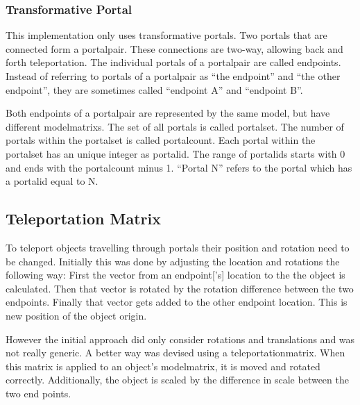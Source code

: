 \subsubsection{Transformative Portal}
This implementation only uses transformative portals.  Two portals  that are connected form a \gls{portalpair}. These connections are two-way, allowing back and forth teleportation. The individual portals of a \gls{portalpair} are called \glspl{endpoint}. Instead of referring to portals of a \gls{portalpair} as \enquote{the \gls{endpoint}} and \enquote{the other \gls{endpoint}}, they are sometimes called \enquote{\gls{endpoint} A} and \enquote{\gls{endpoint} B}.

Both \glspl{endpoint} of a \gls{portalpair} are represented by the same model, but have different \glspl{modelmatrix}. The set of all portals is called \gls{portalset}. The number of portals within the \gls{portalset} is called \gls{portalcount}. Each portal within the \gls{portalset} has an unique integer as \gls{portalid}. The range of \glspl{portalid} starts with 0 and ends with the \gls{portalcount} minus 1. \enquote{Portal N} refers to the portal which has a \gls{portalid} equal to N.


\subsection{Teleportation Matrix}
\label{section:teleportationmatrix}
To teleport objects travelling through portals their position and rotation need to be changed. Initially this was done by adjusting the location and rotations the following way: First the vector from an \gls{endpoint}['s] location to the the object is calculated. Then that vector is rotated by the rotation difference between the two endpoints. Finally that vector gets added to the other endpoint location. This is new position of the object origin.

However the initial approach did only consider rotations and translations and was not really generic. A better way was devised using a \gls{teleportationmatrix}. When this matrix is applied to an object's \gls{modelmatrix}, it is moved and rotated correctly. Additionally, the object is scaled by the difference in scale between the two end points.





